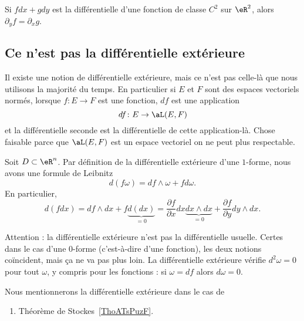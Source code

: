 \begin{lemma}
    Si $fdx+gdy$ est la différentielle d'une fonction de classe $C^2$ sur \( \eR^2\), alors $\partial_yf=\partial_xg$.
\end{lemma}

\subsection{Ce n'est pas la différentielle extérieure}

Il existe une notion de différentielle extérieure, mais ce n'est pas celle-là que nous utilisons la majorité du temps. En particulier si \( E\) et \( F\) sont des espaces vectoriels normés, lorsque \( f\colon E\to F\) est une fonction, \( df\) est une application
\begin{equation}
    df\colon E\to \aL(E,F)
\end{equation}
et la différentielle seconde est la différentielle de cette application-là. Chose faisable parce que \( \aL(E,F)\) est un espace vectoriel on ne peut plus respectable.

Soit $D\subset\eR^n$. Par définition de la différentielle extérieure d'une $1$-forme, nous avons une formule de Leibnitz
\begin{equation}
    d(f\omega)=df\wedge\omega+fd\omega.
\end{equation}
En particulier,
\begin{equation}
    d(fdx)=df\wedge dx+f\underbrace{d(dx)}_{=0}=\frac{ \partial f }{ \partial x }dx\underbrace{dx\wedge dx}_{=0}+\frac{ \partial f }{ \partial y }dy\wedge dx.
\end{equation}

Attention : la différentielle extérieure n'est pas la différentielle usuelle. Certes dans le cas d'une \( 0\)-forme (c'est-à-dire d'une fonction), les deux notions coïncident, mais ça ne va pas plus loin. La différentielle extérieure vérifie \( d^2\omega=0\) pour tout \( \omega\), y compris pour les fonctions : si \( \omega=df\) alors \( d\omega=0\).



Nous mentionnerons la différentielle extérieure dans le cas de
\begin{enumerate}
    \item
        Théorème de Stockes~\ref{ThoATsPuzF}.
\end{enumerate}

